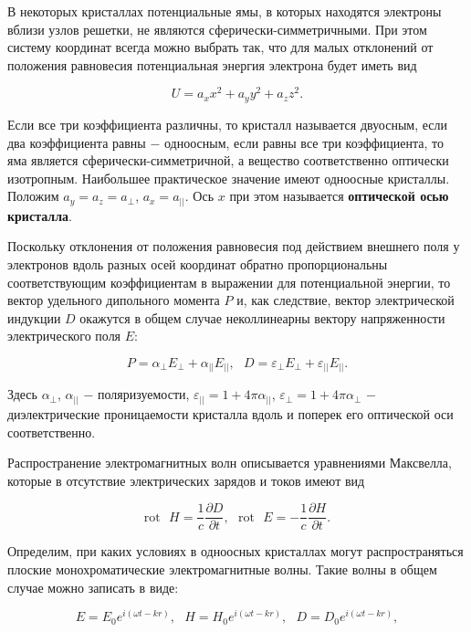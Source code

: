 \documentclass[a4paper,12pt]{article} %
\begin{document}
\hfill \break В некоторых кристаллах потенциальные ямы, в которых находятся электроны вблизи узлов решетки, не являются сферически-симметричными. При этом систему координат всегда можно выбрать так, что для малых отклонений от положения равновесия потенциальная энергия электрона будет иметь вид

$$
U = a_{x} x^2 + a_{y} y^2 + a_{z} z^2.
$$

\hfill \break Если все три коэффициента различны, то кристалл называется двуосным, если два коэффициента равны $-$ одноосным, если равны все три коэффициента, то яма является сферически-симметричной, а вещество соответственно оптически изотропным. Наибольшее практическое значение имеют одноосные кристаллы. Положим $a_{y} = a_{z} = a_{\perp}$, $a_{x} = a_{||}$. Ось $x$ при этом называется \textbf{оптической осью кристалла}.

\hfill \break Поскольку отклонения от положения равновесия под действием внешнего поля у электронов вдоль разных осей координат обратно пропорциональны соответствующим коэффициентам в выражении для потенциальной энергии, то вектор удельного дипольного момента $P$ и, как следствие, вектор электрической индукции $D$ окажутся в общем случае неколлинеарны вектору напряженности электрического поля $E$:

\begin{equation}\label{ linkname }
P = \alpha_{\perp} E_{\perp} + \alpha_{||}E_{||}, \text{ } D = \varepsilon_{\perp}E_{\perp} + \varepsilon_{||}E_{||}.
\end{equation}

\hfill \break Здесь $\alpha_{\perp}$, $\alpha_{||}$ $-$ поляризуемости, $\varepsilon_{||} = 1 + 4\pi \alpha_{||}$, $\varepsilon_{\perp} = 1 + 4\pi \alpha_{\perp}$ $-$ диэлектрические проницаемости кристалла вдоль и поперек его оптической оси соответственно.

\hfill \break Распространение электромагнитных волн описывается уравнениями Максвелла, которые в отсутствие электрических зарядов и токов имеют вид

$$
\text{rot} \text{ } H = \frac{1}{c} \frac {\partial D} {\partial t}, \text{ } \text{rot} \text{ } E = - \frac{1}{c} \frac {\partial H} {\partial t}.
$$

\hfill \break Определим, при каких условиях в одноосных кристаллах могут распространяться плоские монохроматические электромагнитные волны. Такие волны в общем случае можно записать в виде:

$$
E = E_{0}e^{i(\omega t - kr)}, \text{ } H = H_{0} e^{i(\omega t - kr)}, \text{ } D = D_{0} e^{i(\omega t - kr)},
$$
\end{document}
